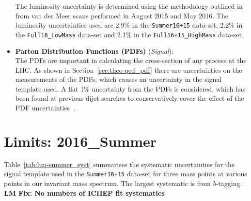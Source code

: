 \begin{itemize}[leftmargin=*]
  The luminosity uncertainty is determined using the methodology outlined in~\cite{lim-syst_lumi}
  from van der Meer scans performed in August 2015 and May 2016.
  The luminosity uncertainties used are 2.9\% in the \verb|Summer16+15| data-set,
  2.2\% in the \verb|Full16_LowMass| data-set
  and 2.1\% in the \verb|Full16+15_HighMass| data-set.
  \vspace{0.5em}
\item\textbf{Parton Distribution Functions (PDFs) } \hspace{1mm}  (\textit{Signal}):\\
  The PDFs are important in calculating the cross-section of any process at the LHC.
  As shown in Section~\ref{sec:theo-qcd_pdf} there are uncertainties on the measurements of the PDFs,
  which causes an uncertainty in the signal template used.
  A flat 1\% uncertainty from the PDFs is considered,
  which has been found at previous dijet searches to conservatively cover
  the effect of the PDF uncertainties~\cite{dijet-mori16_paper}.
  \vspace{0.5em}
\end{itemize}

\section{Limits: 2016\_Summer}
\label{sec:lim-summer}

Table~\ref{tab:lim-summer_syst} summarises the systematic uncertainties
for the signal template used in the \verb|Summer16+15| data-set for
three mass points at various points in our invariant mass spectrum.
The largest systematic is from $b$-tagging.
\textbf{LM Fix: No numbers of ICHEP fit systematics}

